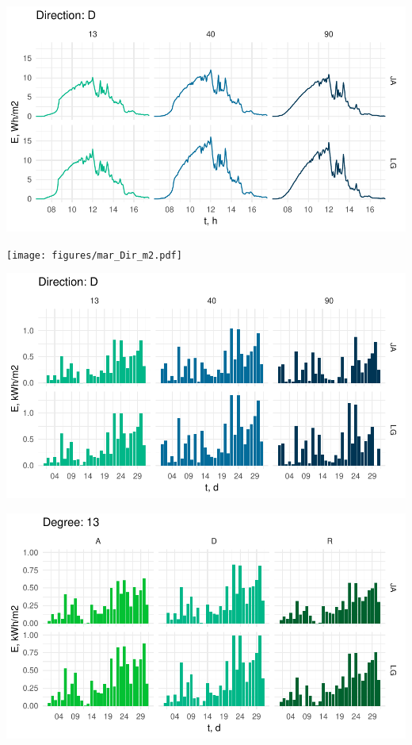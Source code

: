 \begin{center}
    \includegraphics[width=\linewidth]{figures/mar_Deg_lm2.pdf}
\end{center}
\begin{center}
    \texttt{[image: figures/mar\_Dir\_m2.pdf]}
\end{center}
\begin{center}
    \includegraphics[width=\linewidth]{figures/mar_Degbarm2.pdf}
\end{center}
\begin{center}
    \includegraphics[width=\linewidth]{figures/mar_Dirbarm2.pdf}
\end{center}
